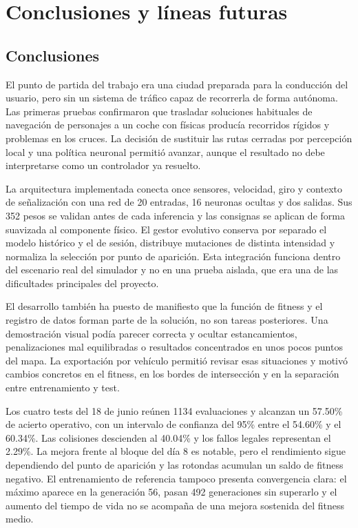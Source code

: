 \chapter{Conclusiones y líneas futuras}

\section{Conclusiones}

El punto de partida del trabajo era una ciudad preparada para la conducción del usuario, pero sin un sistema de tráfico capaz de recorrerla de forma autónoma. Las primeras pruebas confirmaron que trasladar soluciones habituales de navegación de personajes a un coche con físicas producía recorridos rígidos y problemas en los cruces. La decisión de sustituir las rutas cerradas por percepción local y una política neuronal permitió avanzar, aunque el resultado no debe interpretarse como un controlador ya resuelto.

La arquitectura implementada conecta once sensores, velocidad, giro y contexto de señalización con una red de 20 entradas, 16 neuronas ocultas y dos salidas. Sus 352 pesos se validan antes de cada inferencia y las consignas se aplican de forma suavizada al componente físico. El gestor evolutivo conserva por separado el modelo histórico y el de sesión, distribuye mutaciones de distinta intensidad y normaliza la selección por punto de aparición. Esta integración funciona dentro del escenario real del simulador y no en una prueba aislada, que era una de las dificultades principales del proyecto.

El desarrollo también ha puesto de manifiesto que la función de fitness y el registro de datos forman parte de la solución, no son tareas posteriores. Una demostración visual podía parecer correcta y ocultar estancamientos, penalizaciones mal equilibradas o resultados concentrados en unos pocos puntos del mapa. La exportación por vehículo permitió revisar esas situaciones y motivó cambios concretos en el fitness, en los bordes de intersección y en la separación entre entrenamiento y test.

Los cuatro tests del 18 de junio reúnen 1134 evaluaciones y alcanzan un 57.50\% de acierto operativo, con un intervalo de confianza del 95\% entre el 54.60\% y el 60.34\%. Las colisiones descienden al 40.04\% y los fallos legales representan el 2.29\%. La mejora frente al bloque del día 8 es notable, pero el rendimiento sigue dependiendo del punto de aparición y las rotondas acumulan un saldo de fitness negativo. El entrenamiento de referencia tampoco presenta convergencia clara: el máximo aparece en la generación 56, pasan 492 generaciones sin superarlo y el aumento del tiempo de vida no se acompaña de una mejora sostenida del fitness medio.

